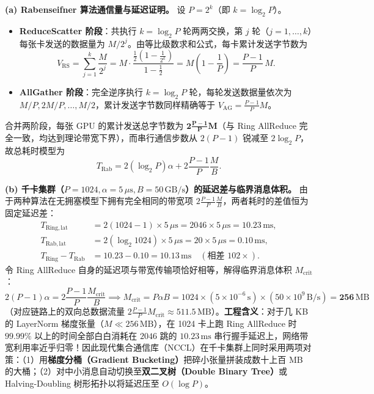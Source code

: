 
\textbf{(a) Rabenseifner 算法通信量与延迟证明。} 设 $P = 2^k$（即 $k = \log_2 P$）。
\begin{itemize}
  \item \textbf{ReduceScatter 阶段}：共执行 $k = \log_2 P$ 轮两两交换，第 $j$ 轮（$j = 1, \dots, k$）每张卡发送的数据量为 $M / 2^j$。由等比级数求和公式，每卡累计发送字节数为
  \[
    V_{\mathrm{RS}} = \sum_{j=1}^{k} \frac{M}{2^j} = M \cdot \frac{\frac{1}{2}\left(1 - \frac{1}{2^k}\right)}{1 - \frac{1}{2}} = M\left(1 - \frac{1}{P}\right) = \frac{P - 1}{P}\,M.
  \]
  \item \textbf{AllGather 阶段}：完全逆序执行 $k = \log_2 P$ 轮，每轮发送数据量依次为 $M/P, 2M/P, \dots, M/2$，累计发送字节数同样精确等于 $V_{\mathrm{AG}} = \frac{P-1}{P} M$。
\end{itemize}
合并两阶段，每张 GPU 的累计发送总字节数为 $\mathbf{2\frac{P-1}{P}M}$（与 Ring AllReduce 完全一致，均达到理论带宽下界），而串行通信步数从 $2(P-1)$ 锐减至 $2\log_2 P$，故总耗时模型为
\[
  T_{\mathrm{Rab}} = 2(\log_2 P)\alpha + 2\frac{P - 1}{P}\frac{M}{B}.
\]

\textbf{(b) 千卡集群（$P = 1024, \alpha = 5\,\mu\mathrm{s}, B = 50\,\mathrm{GB/s}$）的延迟差与临界消息体积。} 由于两种算法在无拥塞模型下拥有完全相同的带宽项 $2\frac{P-1}{P}\frac{M}{B}$，两者耗时的差值恒为固定延迟差：
\begin{align*}
  T_{\mathrm{Ring,lat}} &= 2(1024 - 1) \times 5\,\mu\mathrm{s} = 2046 \times 5\,\mu\mathrm{s} = \mathbf{10.23\,\mathrm{ms}}, \\
  T_{\mathrm{Rab,lat}} &= 2(\log_2 1024) \times 5\,\mu\mathrm{s} = 20 \times 5\,\mu\mathrm{s} = \mathbf{0.10\,\mathrm{ms}}, \\
  T_{\mathrm{Ring}} - T_{\mathrm{Rab}} &= 10.23 - 0.10 = \mathbf{10.13\,\mathrm{ms}} \quad (\text{相差 } 102\times).
\end{align*}
令 Ring AllReduce 自身的延迟项与带宽传输项恰好相等，解得临界消息体积 $M_{\mathrm{crit}}$：
\[
  2(P - 1)\alpha = 2\frac{P - 1}{P}\frac{M_{\mathrm{crit}}}{B}
  \implies M_{\mathrm{crit}} = P \alpha B = 1024 \times (5 \times 10^{-6}\,\mathrm{s}) \times (50 \times 10^9\,\mathrm{B/s}) = \mathbf{256\,\mathrm{MB}}
\]
（对应链路上的双向总数据流量 $2\frac{P-1}{P} M_{\mathrm{crit}} \approx 511.5\,\mathrm{MB}$）。\textbf{工程含义}：对于几 KB 的 LayerNorm 梯度张量（$M \ll 256\,\mathrm{MB}$），在 1024 卡上跑 Ring AllReduce 时 $99.99\%$ 以上的时间全部白白消耗在 $2046$ 跳的 $10.23\,\mathrm{ms}$ 串行握手延迟上，网络带宽利用率近乎归零！因此现代集合通信库（NCCL）在千卡集群上同时采用两项对策：（1）用\textbf{梯度分桶（Gradient Bucketing）}把碎小张量拼装成数十上百 MB 的大桶；（2）对中小消息自动切换至\textbf{双二叉树（Double Binary Tree）}或 Halving-Doubling 树形拓扑以将延迟压至 $O(\log P)$。

